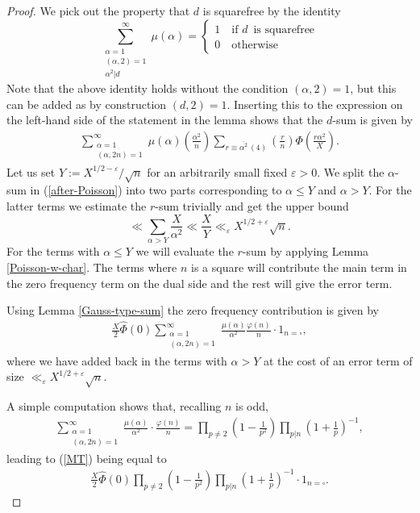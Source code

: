 \documentclass[a4paper,10pt,twoside]{amsart}
\theoremstyle{definition}
\numberwithin{equation}{section}
\newcommand\eps{\varepsilon}
\renewcommand\:{\colon}
\begin{document}
\begin{proof}
We pick out the property that $d$ is squarefree by the identity
\begin{equation}\label{sqf-detection}
\sum_{\substack{\alpha=1\\
(\alpha,2)=1\\
\alpha^2|d}}^\infty\mu(\alpha)=\begin{cases}
1\quad\text{if }d\,\text{ is squarefree}\\
0\quad\text{otherwise}
\end{cases}
\end{equation}
Note that the above identity holds without the condition $(\alpha,2)=1$, but this can be added as by construction $(d,2)=1$. Inserting this to the expression on the left-hand side of the statement in the lemma shows that the $d$-sum is given by
\begin{align}\label{after-Poisson}
\sum_{\substack{\alpha=1\\
(\alpha,2n)=1}}^\infty\mu(\alpha)\left(\frac{\alpha^2}{n}\right)\sum_{r\equiv\overline{\alpha^2}\,(4)}\left(\frac r{n}\right)\Phi\left(\frac{r\alpha^2}X\right).
\end{align}
Let us set $Y:=X^{1/2-\eps}/\sqrt{n}$ for an arbitrarily small fixed $\eps>0$. We split the $\alpha$-sum in (\ref{after-Poisson}) into two parts corresponding to $\alpha\leq Y$ and $\alpha>Y$. For the latter terms we estimate the $r$-sum trivially and get the upper bound 
\[ 
\ll\sum_{\alpha>Y}\frac X{\alpha^2}\ll\frac{X}Y\ll_\eps X^{1/2+\eps}\sqrt{n}.
\]
For the terms with $\alpha\leq Y$ we will evaluate the $r$-sum by applying Lemma \ref{Poisson-w-char}. The terms where $n$ is a square will contribute the main term in the zero frequency term on the dual side and the rest will give the error term.

Using Lemma \ref{Gauss-type-sum} the zero frequency contribution is given by
\begin{align}\label{MT}
\frac{X}{2}\widehat\Phi(0)\sum_{\substack{\alpha=1\\
(\alpha,2n)=1}}^\infty\frac{\mu(\alpha)}{\alpha^2}\frac{\varphi(n)}{n}\cdot 1_{n=\square},
\end{align}
where we have added back in the terms with $\alpha>Y$ at the cost of an error term of size $\ll_\eps X^{1/2+\varepsilon}\sqrt{n}$.

A simple computation shows that, recalling $n$ is odd,
\begin{align}\label{simplification}
\sum_{\substack{\alpha=1\\
(\alpha,2n)=1}}^\infty\frac{\mu(\alpha)}{\alpha^2}\cdot\frac{\varphi(n)}{n}=\prod_{p\neq 2}\left(1-\frac1{p^2}\right)\prod_{p|n}\left(1+\frac1p\right)^{-1}, 
\end{align}
leading to (\ref{MT}) being equal to 
\begin{align}\label{productform}
\frac{X}{2}\widehat\Phi(0)\prod_{p\neq 2}\left(1-\frac1{p^2}\right)\prod_{p|n}\left(1+\frac1p\right)^{-1}\cdot 1_{n=\square}.
\end{align}


\end{proof}
\end{document}
